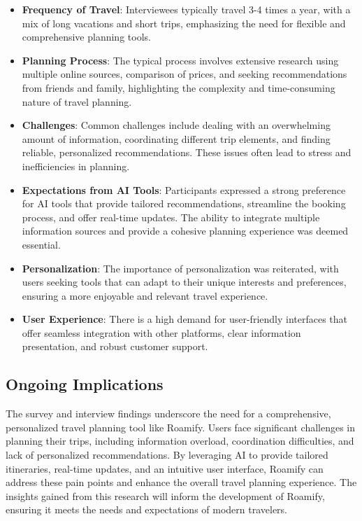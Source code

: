 \documentclass[conference]{IEEEtran}
\begin{document}
\begin{itemize}
    \item \textbf{Frequency of Travel}: Interviewees typically travel 3-4 times a year, with a mix of long vacations and short trips, emphasizing the need for flexible and comprehensive planning tools.
    \item \textbf{Planning Process}: The typical process involves extensive research using multiple online sources, comparison of prices, and seeking recommendations from friends and family, highlighting the complexity and time-consuming nature of travel planning.
    \item \textbf{Challenges}: Common challenges include dealing with an overwhelming amount of information, coordinating different trip elements, and finding reliable, personalized recommendations. These issues often lead to stress and inefficiencies in planning.
    \item \textbf{Expectations from AI Tools}: Participants expressed a strong preference for AI tools that provide tailored recommendations, streamline the booking process, and offer real-time updates. The ability to integrate multiple information sources and provide a cohesive planning experience was deemed essential.
    \item \textbf{Personalization}: The importance of personalization was reiterated, with users seeking tools that can adapt to their unique interests and preferences, ensuring a more enjoyable and relevant travel experience.
    \item \textbf{User Experience}: There is a high demand for user-friendly interfaces that offer seamless integration with other platforms, clear information presentation, and robust customer support.
\end{itemize}

\subsection{Ongoing Implications}
The survey and interview findings underscore the need for a comprehensive, personalized travel planning tool like Roamify. Users face significant challenges in planning their trips, including information overload, coordination difficulties, and lack of personalized recommendations. By leveraging AI to provide tailored itineraries, real-time updates, and an intuitive user interface, Roamify can address these pain points and enhance the overall travel planning experience. The insights gained from this research will inform the development of Roamify, ensuring it meets the needs and expectations of modern travelers.
\end{document}
